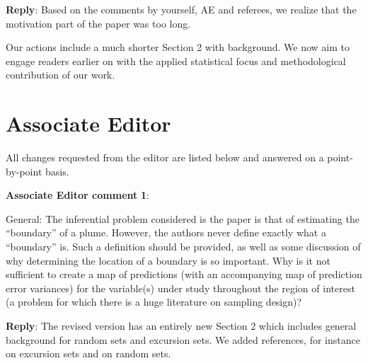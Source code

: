 \documentclass[a4paper]{article}
\newcounter{reviewer}
\def\aecom{\textbf{Associate Editor comment }}
\def\reply{\textbf{Reply}}
\begin{document}
\reply: Based on the comments by yourself, AE and referees, we realize that the motivation part of the paper was too long. 

Our actions include a much shorter Section 2 with background. We now aim to engage readers earlier on with the applied statistical focus and methodological contribution of our work. 



 \section*{Associate Editor}
All changes requested from the editor are listed below and answered on a point-by-point basis.

\setcounter{reviewer}{1}





\vspace{5mm}
\noindent \aecom \textbf{1}:

General: The inferential problem considered is the paper is that of estimating the “boundary” of a plume. However, the authors never define exactly what a “boundary” is. Such a definition should be provided, as well as some discussion of why determining the location of a boundary is so important. Why is it not sufficient to create a map of predictions (with an accompanying map of prediction error variances) for the variable(s) under study throughout the region of interest (a problem for which there is a huge literature on sampling design)?\par

\reply: The revised version has an entirely new Section 2 which includes general background for random sets and excursion sets. We added references, for instance \cite{Adler.Taylor2007} on excursion sets and \cite{Molchanov2005} on random sets.

\vspace{1em}
\end{document}
